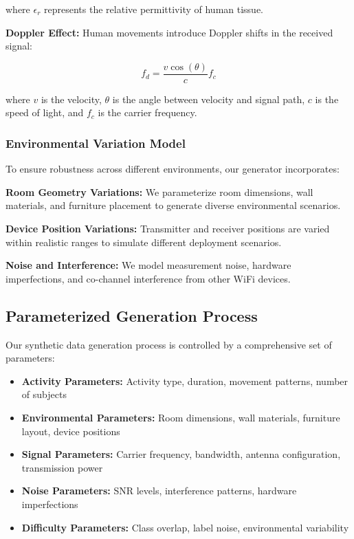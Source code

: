 \documentclass[journal]{IEEEtran}
\begin{document}
where $\epsilon_r$ represents the relative permittivity of human tissue.

\textbf{Doppler Effect:} Human movements introduce Doppler shifts in the received signal:

\begin{equation}
f_d = \frac{v \cos(\theta)}{c} f_c
\end{equation}

where $v$ is the velocity, $\theta$ is the angle between velocity and signal path, $c$ is the speed of light, and $f_c$ is the carrier frequency.

\subsubsection{Environmental Variation Model}

To ensure robustness across different environments, our generator incorporates:

\textbf{Room Geometry Variations:} We parameterize room dimensions, wall materials, and furniture placement to generate diverse environmental scenarios.

\textbf{Device Position Variations:} Transmitter and receiver positions are varied within realistic ranges to simulate different deployment scenarios.

\textbf{Noise and Interference:} We model measurement noise, hardware imperfections, and co-channel interference from other WiFi devices.

\subsection{Parameterized Generation Process}

Our synthetic data generation process is controlled by a comprehensive set of parameters:

\begin{itemize}
\item \textbf{Activity Parameters:} Activity type, duration, movement patterns, number of subjects
\item \textbf{Environmental Parameters:} Room dimensions, wall materials, furniture layout, device positions
\item \textbf{Signal Parameters:} Carrier frequency, bandwidth, antenna configuration, transmission power
\item \textbf{Noise Parameters:} SNR levels, interference patterns, hardware imperfections
\item \textbf{Difficulty Parameters:} Class overlap, label noise, environmental variability
\end{itemize}
\end{document}
